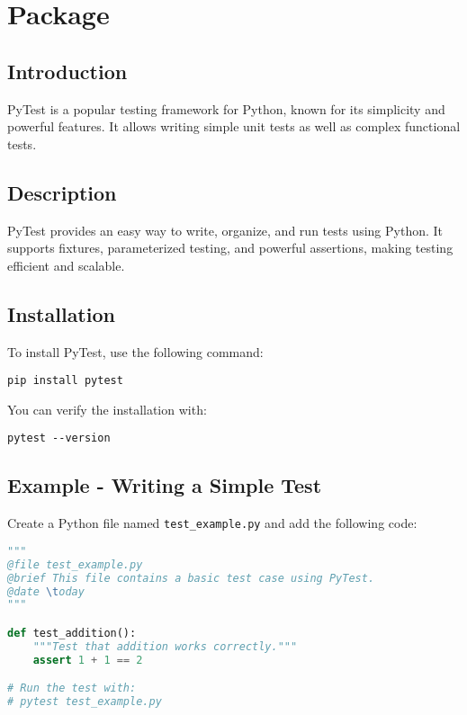 %
%
%


\chapter{Package }

\section{Introduction}
PyTest is a popular testing framework for Python, known for its simplicity and powerful features. It allows writing simple unit tests as well as complex functional tests.

\section{Description}
PyTest provides an easy way to write, organize, and run tests using Python. It supports fixtures, parameterized testing, and powerful assertions, making testing efficient and scalable.

\section{Installation}
To install PyTest, use the following command:

\begin{verbatim}
pip install pytest
\end{verbatim}

You can verify the installation with:

\begin{verbatim}
pytest --version
\end{verbatim}

\section{Example - Writing a Simple Test}

Create a Python file named \texttt{test\_example.py} and add the following code:

\begin{lstlisting}[language=Python, caption=Basic PyTest Example]
"""
@file test_example.py
@brief This file contains a basic test case using PyTest.
@date \today
"""

def test_addition():
    """Test that addition works correctly."""
    assert 1 + 1 == 2

# Run the test with:
# pytest test_example.py
\end{lstlisting}

